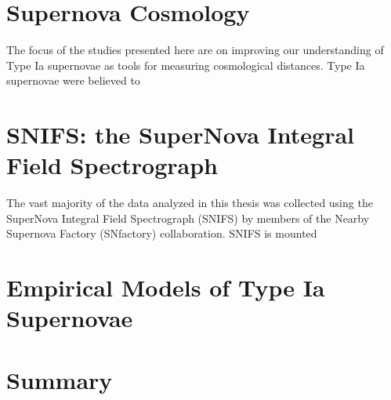 \section{Supernova Cosmology}
The focus of the studies presented here are on improving our understanding of Type Ia supernovae as tools for measuring cosmological distances. Type Ia supernovae were believed to 

\section{SNIFS: the SuperNova Integral Field Spectrograph}
The vast majority of the data analyzed in this thesis was collected using the SuperNova Integral Field Spectrograph (SNIFS) by members of the Nearby Supernova Factory (SNfactory) collaboration. SNIFS is mounted 

\section{Empirical Models of Type Ia Supernovae}

\section{Summary}
